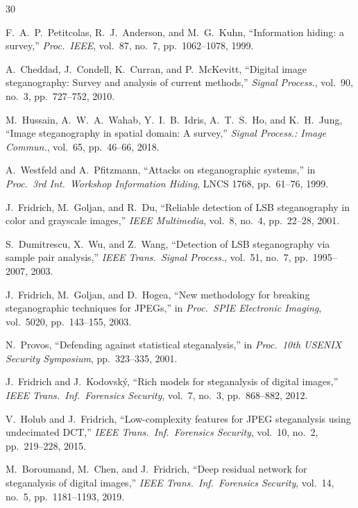 \documentclass[10pt,twocolumn,a4paper]{article}
\begin{document}
\begin{thebibliography}{30}\small

F.~A.~P.~Petitcolas, R.~J.~Anderson, and M.~G.~Kuhn,
``Information hiding: a survey,''
\textit{Proc.\ IEEE}, vol.~87, no.~7, pp.~1062--1078, 1999.

A.~Cheddad, J.~Condell, K.~Curran, and P.~McKevitt,
``Digital image steganography: Survey and analysis of current methods,''
\textit{Signal Process.}, vol.~90, no.~3, pp.~727--752, 2010.

M.~Hussain, A.~W.~A.~Wahab, Y.~I.~B.~Idris, A.~T.~S.~Ho, and K.~H.~Jung,
``Image steganography in spatial domain: A survey,''
\textit{Signal Process.: Image Commun.}, vol.~65, pp.~46--66, 2018.

A.~Westfeld and A.~Pfitzmann,
``Attacks on steganographic systems,''
in \textit{Proc.\ 3rd Int.\ Workshop Information Hiding}, LNCS 1768, pp.~61--76, 1999.

J.~Fridrich, M.~Goljan, and R.~Du,
``Reliable detection of LSB steganography in color and grayscale images,''
\textit{IEEE Multimedia}, vol.~8, no.~4, pp.~22--28, 2001.

S.~Dumitrescu, X.~Wu, and Z.~Wang,
``Detection of LSB steganography via sample pair analysis,''
\textit{IEEE Trans.\ Signal Process.}, vol.~51, no.~7, pp.~1995--2007, 2003.

J.~Fridrich, M.~Goljan, and D.~Hogea,
``New methodology for breaking steganographic techniques for JPEGs,''
in \textit{Proc.\ SPIE Electronic Imaging}, vol.~5020, pp.~143--155, 2003.

N.~Provos,
``Defending against statistical steganalysis,''
in \textit{Proc.\ 10th USENIX Security Symposium}, pp.~323--335, 2001.

J.~Fridrich and J.~Kodovsk\'{y},
``Rich models for steganalysis of digital images,''
\textit{IEEE Trans.\ Inf.\ Forensics Security}, vol.~7, no.~3, pp.~868--882, 2012.

V.~Holub and J.~Fridrich,
``Low-complexity features for JPEG steganalysis using undecimated DCT,''
\textit{IEEE Trans.\ Inf.\ Forensics Security}, vol.~10, no.~2, pp.~219--228, 2015.

M.~Boroumand, M.~Chen, and J.~Fridrich,
``Deep residual network for steganalysis of digital images,''
\textit{IEEE Trans.\ Inf.\ Forensics Security}, vol.~14, no.~5, pp.~1181--1193, 2019.


\end{thebibliography}
\end{document}
